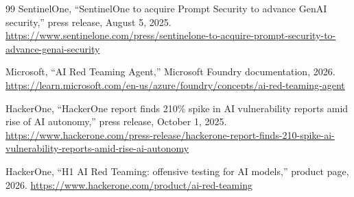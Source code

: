 \begin{thebibliography}{99}
 SentinelOne, ``SentinelOne to acquire Prompt
Security to advance GenAI security,'' press release, August 5, 2025.
\url{https://www.sentinelone.com/press/sentinelone-to-acquire-prompt-security-to-advance-genai-security}

 Microsoft, ``AI Red Teaming Agent,'' Microsoft Foundry
documentation, 2026.
\url{https://learn.microsoft.com/en-us/azure/foundry/concepts/ai-red-teaming-agent}

 HackerOne, ``HackerOne report finds 210\% spike in AI
vulnerability reports amid rise of AI autonomy,'' press release, October 1,
2025.
\url{https://www.hackerone.com/press-release/hackerone-report-finds-210-spike-ai-vulnerability-reports-amid-rise-ai-autonomy}

 HackerOne, ``H1 AI Red Teaming: offensive testing for
AI models,'' product page, 2026.
\url{https://www.hackerone.com/product/ai-red-teaming}

\end{thebibliography}
